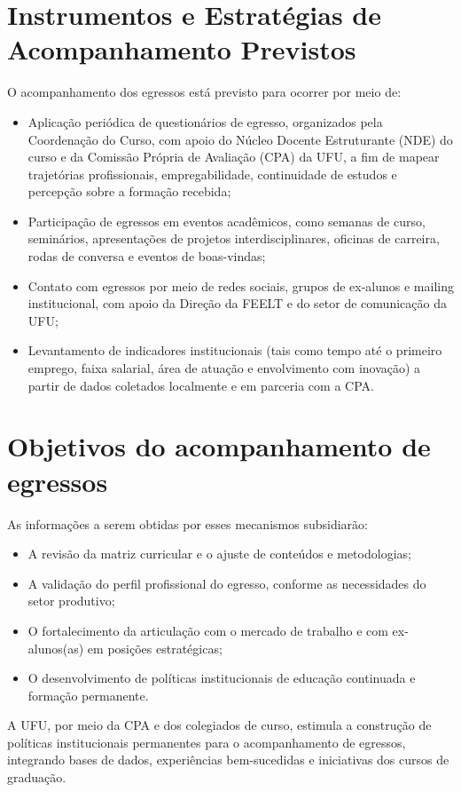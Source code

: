 \section{Instrumentos e Estratégias de Acompanhamento Previstos}

O acompanhamento dos egressos está previsto para ocorrer por meio de:

\begin{itemize}
    \item Aplicação periódica de questionários de egresso, organizados pela Coordenação do Curso, com apoio do Núcleo Docente Estruturante (NDE) do curso e da Comissão Própria de Avaliação (CPA) da UFU, a fim de mapear trajetórias profissionais, empregabilidade, continuidade de estudos e percepção sobre a formação recebida;
    \item Participação de egressos em eventos acadêmicos, como semanas de curso, seminários, apresentações de projetos interdisciplinares, oficinas de carreira, rodas de conversa e eventos de boas-vindas;
    \item Contato com egressos por meio de redes sociais, grupos de ex-alunos e mailing institucional, com apoio da Direção da FEELT e do setor de comunicação da UFU;
    \item Levantamento de indicadores institucionais (tais como tempo até o primeiro emprego, faixa salarial, área de atuação e envolvimento com inovação) a partir de dados coletados localmente e em parceria com a CPA.
\end{itemize}

\section{Objetivos do acompanhamento de egressos}

As informações a serem obtidas por esses mecanismos subsidiarão:

\begin{itemize}
    \item A revisão da matriz curricular e o ajuste de conteúdos e metodologias;
    \item A validação do perfil profissional do egresso, conforme as necessidades do setor produtivo;
    \item O fortalecimento da articulação com o mercado de trabalho e com ex-alunos(as) em posições estratégicas;
    \item O desenvolvimento de políticas institucionais de educação continuada e formação permanente.
\end{itemize}

A UFU, por meio da CPA e dos colegiados de curso, estimula a construção de políticas institucionais permanentes para o acompanhamento de egressos, integrando bases de dados, experiências bem-sucedidas e iniciativas dos cursos de graduação.
